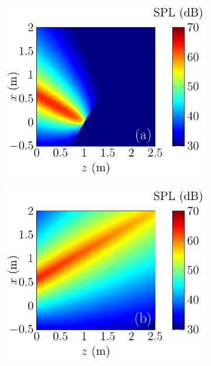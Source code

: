 \begin{figure}[H]
    \centering
    \begin{subfigure}{0.32\textwidth}
        \centering
        \includegraphics[width = \textwidth]{fig/ComputePalReflectionTruncated_Ultra60000_LocSurface1m_Orignal_211013A.pdf}
    \end{subfigure}
    \begin{subfigure}{0.32\textwidth}
        \centering
        \includegraphics[width = \textwidth]{fig/ComputePalReflectionTruncated_Ultra60000_LocSurface1m_Image_211013B.pdf}

\end{subfigure}
\end{figure}
